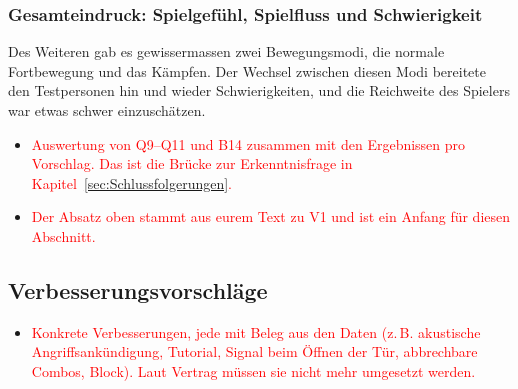 \documentclass[../Main.tex]{subfiles}
\begin{document}
\subsubsection{Gesamteindruck: Spielgefühl, Spielfluss und Schwierigkeit} \label{sec:Gesamteindruck}

Des Weiteren gab es gewissermassen zwei Bewegungsmodi, die normale Fortbewegung und das Kämpfen. Der Wechsel zwischen diesen Modi bereitete den Testpersonen hin und wieder Schwierigkeiten, und die Reichweite des Spielers war etwas schwer einzuschätzen.

\begin{itemize}[leftmargin=1.5cm]
    \item \textcolor{red}{Auswertung von Q9--Q11 und B14 zusammen mit den Ergebnissen pro Vorschlag. Das ist die Brücke zur Erkenntnisfrage in Kapitel~\ref{sec:Schlussfolgerungen}.}
    \item \textcolor{red}{Der Absatz oben stammt aus eurem Text zu V1 und ist ein Anfang für diesen Abschnitt.}
\end{itemize}

\subsection{Verbesserungsvorschläge} \label{sec:Verbesserungen}

\begin{itemize}[leftmargin=1.5cm]
    \item \textcolor{red}{Konkrete Verbesserungen, jede mit Beleg aus den Daten (z.\,B. akustische Angriffsankündigung, Tutorial, Signal beim Öffnen der Tür, abbrechbare Combos, Block). Laut Vertrag müssen sie nicht mehr umgesetzt werden.}
\end{itemize}
\end{document}
